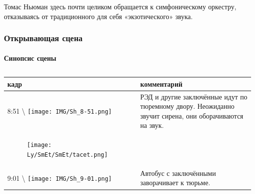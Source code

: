 Томас Ньюман здесь почти целиком обращается к симфоническому оркестру, отказываясь от традиционного для себя «экзотического» звука.

\subsubsection{Открывающая сцена}\label{ux43eux442ux43aux440ux44bux432ux430ux44eux449ux430ux44f-ux441ux446ux435ux43dux430-2}

\paragraph{Синопсис сцены}\label{ux441ux438ux43dux43eux43fux441ux438ux441-ux441ux446ux435ux43dux44b-2}

\begin{longtable}[]{@{}ll@{}}
\toprule
\begin{minipage}[b]{0.30\columnwidth}\raggedright\strut
кадр\strut
\end{minipage} & \begin{minipage}[b]{0.64\columnwidth}\raggedright\strut
комментарий\strut
\end{minipage}\tabularnewline
\midrule
\endhead
\begin{minipage}[t]{0.30\columnwidth}\raggedright\strut
8:51 \textbackslash{}
\texttt{[image: IMG/Sh\_8-51.png]}\strut
\end{minipage} & \begin{minipage}[t]{0.64\columnwidth}\raggedright\strut
РЭД и другие заключённые идут по тюремному двору.
Неожиданно звучит сирена, они оборачиваются на звук.\strut
\end{minipage}\tabularnewline
\begin{minipage}[t]{0.30\columnwidth}\raggedright\strut
\begin{figure}
\centering
\texttt{[image: Ly/SmEt/SmEt/tacet.png]}
\caption{}
\end{figure}
\strut
\end{minipage} & \begin{minipage}[t]{0.64\columnwidth}\raggedright\strut
\strut
\end{minipage}\tabularnewline
\begin{minipage}[t]{0.30\columnwidth}\raggedright\strut
9:01 \textbackslash{}
\texttt{[image: IMG/Sh\_9-01.png]}\strut
\end{minipage} & \begin{minipage}[t]{0.64\columnwidth}\raggedright\strut
Автобус с заключёнными заворачивает к тюрьме.

\end{minipage}
\end{longtable}
